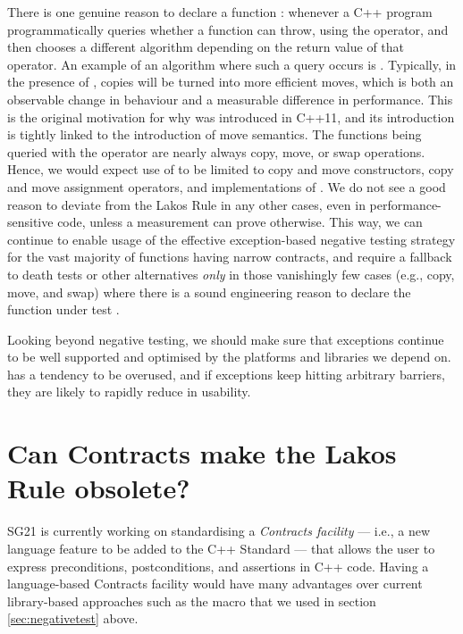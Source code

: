 There is one genuine reason to declare a function : whenever a C++ program programmatically queries whether a function can throw, using the  operator, and then chooses a different algorithm depending on the return value of that operator. An example of an algorithm where such a query occurs is . Typically, in the presence of , copies will be turned into more efficient moves, which is both an observable change in behaviour and a measurable difference in performance. This is the original motivation for why  was introduced in C++11, and its introduction is tightly linked to the introduction of move semantics. The functions being queried with the  operator are nearly always copy, move, or swap operations. Hence, we would expect use of  to be limited to copy and move constructors, copy and move assignment operators, and implementations of . We do not see a good reason to deviate from the Lakos Rule in any other cases, even in performance-sensitive code, unless a measurement can prove otherwise. This way, we can continue to enable usage of the effective exception-based negative testing strategy for the vast majority of functions having narrow contracts, and require a fallback to death tests or other alternatives \emph{only} in those vanishingly few cases (e.g., copy, move, and swap) where there is a sound engineering reason to declare the function under test .

Looking beyond negative testing, we should make sure that exceptions continue to be well supported and optimised by the platforms and libraries we depend on.  has a tendency to be overused, and if exceptions keep hitting arbitrary  barriers, they are likely to rapidly reduce in usability. 

\section{Can Contracts make the Lakos Rule obsolete?}
\label{sec:contracts}

SG21 is currently working on standardising a \emph{Contracts facility} --- i.e., a new language feature to be added to the C++ Standard --- that allows the user to express preconditions, postconditions, and assertions in C++ code. Having a language-based Contracts facility would have many advantages over current library-based approaches such as the  macro that we used in section \ref{sec:negativetest} above.

